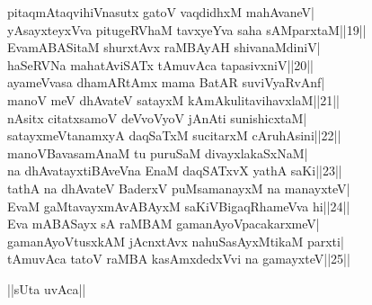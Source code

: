 \documentclass{article}
\begin{document}
pitaqmAtaqvihiVnasutx gatoV vaqdidhxM mahAvaneV|\\
yAsayxteyxVva pitugeRVhaM tavxyeYva saha sAMparxtaM||19||\\
EvamABASitaM shurxtAvx raMBAyAH shivanaMdiniV|\\
haSeRVNa mahatAviSATx tAmuvAca tapasivxniV||20||\\
ayameVvasa dhamARtAmx mama BatAR suviVyaRvAnf|\\
manoV meV dhAvateV satayxM kAmAkulitavihavxlaM||21||\\
nAsitx citatxsamoV deVvoVyoV jAnAti sunishicxtaM|\\
satayxmeVtanamxyA daqSaTxM sucitarxM cAruhAsini||22||\\
manoVBavasamAnaM tu puruSaM divayxlakaSxNaM|\\
na dhAvatayxtiBAveVna EnaM daqSATxvX yathA saKi||23||\\
tathA na dhAvateV BaderxV puMsamanayxM na manayxteV|\\
EvaM gaMtavayxmAvABAyxM saKiVBigaqRhameVva hi||24||\\
Eva mABASayx sA raMBAM gamanAyoVpacakarxmeV|\\
gamanAyoVtusxkAM jAcnxtAvx nahuSasAyxMtikaM parxti|\\
tAmuvAca tatoV raMBA kasAmxdedxVvi na gamayxteV||25||\\

\begin{center}
||sUta uvAca||
\end{center}
\end{document}
